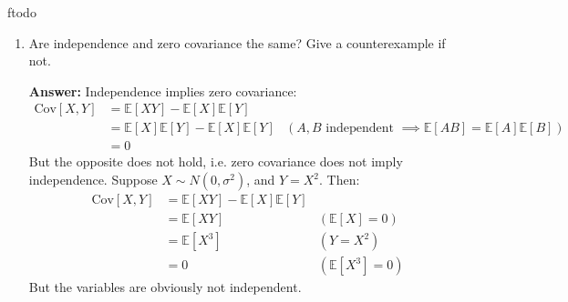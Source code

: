 ƒtodo\documentclass{article}
\newenvironment{QandA}{\begin{enumerate}[label=\arabic*.]}{\end{enumerate}}
\newenvironment{answer}{\par\normalfont \textbf{Answer:}}{}
\newcommand{\Exp}[1]{\mathbb{E}\left[ #1 \right]}
\newcommand{\Cov}[1]{\text{Cov}\left[ #1 \right]}
\begin{document}
\begin{QandA}
\begin{answer}
        The fourth standardized moment, called \textit{kurtosis}, measures the combined size of the tails relative to the whole distribution:
        \begin{align*}
            \bar{m}_4 = \Exp{\left( \frac{X - \mu_x}{\sigma_x} \right)^4} = \int_{-\infty}^{\infty} \left( \frac{x - \mu_x}{\sigma_x}\right)^4 p(x) dx
        \end{align*}
        Unlike skewness’s cubic term which preserves sign, kurtosis’s even power means that the metric is always positive and that long tails on either side dominate the calculation. Just as we saw with skewness, kurtosis’s fourth power means that standard scores less than 1—again, data near the peak of the distribution—only marginally contribute to the total calculation. In other words, kurtosis measures tailedness, not peakedness. \\\\
        What about moments of higher order? The short answer is, for $k \ge 5$:
        \begin{itemize}
            \item if $k$ is odd, then this standardized moment essentially captures nearly the same information as the skewness (since it preserves sign), with the only difference being the magnitude with which we penalize outliers far away from the center. 
            \item Similarly, if $k$ is even, then this standardized moment captures nearly the same information as kurtosis, since it disregards the sign of the terms. 
        \end{itemize}

        (Source: \href{https://gregorygundersen.com/blog/2020/04/11/moments/}{this awesome blog} from Gregory Gundersen)
    \end{answer}

    \item Are independence and zero covariance the same? Give a counterexample if not. 
    \begin{answer}
        Independence implies zero covariance:
        \begin{align*}
            \Cov{X, Y} &= \Exp{XY} - \Exp{X}\Exp{Y} \\
            &= \Exp{X}\Exp{Y} - \Exp{X}\Exp{Y} & (A, B \text{ independent } \implies \Exp{AB} = \Exp{A}\Exp{B})\\
            &= 0
        \end{align*}
        But the opposite does not hold, i.e. zero covariance does not imply independence. Suppose $X \sim N(0, \sigma^2)$, and $Y = X^2$. Then:
        \begin{align*}
            \Cov{X, Y} &= \Exp{XY} - \Exp{X}\Exp{Y}  \\
            &= \Exp{XY} & (\Exp{X} = 0) \\
            &= \Exp{X^3} & (Y = X^2)\\
            &= 0  & (\Exp{X^3} = 0)
        \end{align*}
        But the variables are obviously not independent.
        

\end{answer}
\end{QandA}
\end{document}
